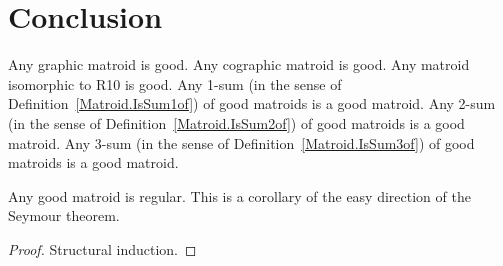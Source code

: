 \chapter{Conclusion}

\begin{definition}
    \label{Matroid.IsGood}
    \leanok
    Any graphic matroid is good.
    Any cographic matroid is good.
    Any matroid isomorphic to R10 is good.
    Any 1-sum (in the sense of Definition~\ref{Matroid.IsSum1of}) of good matroids is a good matroid.
    Any 2-sum (in the sense of Definition~\ref{Matroid.IsSum2of}) of good matroids is a good matroid.
    Any 3-sum (in the sense of Definition~\ref{Matroid.IsSum3of}) of good matroids is a good matroid.
\end{definition}

\begin{corollary}
    \label{Matroid.IsGood.isRegular}
    \leanok
    Any good matroid is regular. This is a corollary of the easy direction of the Seymour theorem.
\end{corollary}

\begin{proof}
    Structural induction.
\end{proof}
